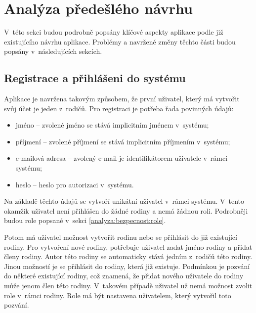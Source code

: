 \section{Analýza předešlého návrhu} \label{analyza:analyza navrhu}
    V~této sekci budou podrobně popsány klíčové aspekty aplikace podle již existujícího návrhu aplikace. Problémy a navržené změny těchto části budou popsány v~následujících sekcích.

    \subsection{Registrace a přihlášeni do systému}
        Aplikace je navržena takovým způsobem, že první uživatel, který má vytvořit svůj účet je jeden z~rodičů. Pro registraci je potřeba řada povinných údajů:
        \begin{itemize}
	        \item jméno -- zvolené jméno se stává implicitním jménem v~systému;
	        \item příjmení -- zvolené příjmení se stává implicitním příjmením v~systému;
	        \item e-mailová adresa -- zvolený e-mail je identifikátorem uživatele v~rámci systému;
	        \item heslo -- heslo pro autorizaci v~systému.
        \end{itemize}
        Na základě těchto údajů se vytvoří unikátní uživatel v~rámci systému. V~tento okamžik uživatel není přihlášen do žádné rodiny a nemá žádnou roli. Podrobněji budou role popsané v~sekci \ref{analyza:bezpecnost:role}.
        
        Potom má uživatel možnost vytvořit rodinu nebo se přihlásit do již existující rodiny. Pro vytvoření nové rodiny, potřebuje uživatel zadat jméno rodiny a přidat členy rodiny. Autor této rodiny se automaticky stává jedním z~rodičů této rodiny. Jinou možností je se přihlásit do rodiny, která již existuje. Podmínkou je pozvání do některé existující rodiny, což znamená, že přidat nového uživatele do rodiny může jenom člen této rodiny. V~takovém případě uživatel už nemá možnost zvolit role v~rámci rodiny. Role má být nastavena uživatelem, který vytvořil toto pozvání.

